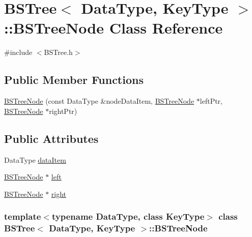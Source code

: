 \hypertarget{class_b_s_tree_1_1_b_s_tree_node}{\section{\-B\-S\-Tree$<$ \-Data\-Type, \-Key\-Type $>$\-:\-:\-B\-S\-Tree\-Node \-Class \-Reference}
\label{class_b_s_tree_1_1_b_s_tree_node}
}


{\ttfamily \#include $<$\-B\-S\-Tree.\-h$>$}

\subsection*{\-Public \-Member \-Functions}
\begin{DoxyCompactItemize}
\item 
\hyperlink{class_b_s_tree_1_1_b_s_tree_node_a40f0e1ccea243f6d47b5c1b0a2913ff8}{\-B\-S\-Tree\-Node} (const \-Data\-Type \&node\-Data\-Item, \hyperlink{class_b_s_tree_1_1_b_s_tree_node}{\-B\-S\-Tree\-Node} $\ast$left\-Ptr, \hyperlink{class_b_s_tree_1_1_b_s_tree_node}{\-B\-S\-Tree\-Node} $\ast$right\-Ptr)
\end{DoxyCompactItemize}
\subsection*{\-Public \-Attributes}
\begin{DoxyCompactItemize}
\item 
\-Data\-Type \hyperlink{class_b_s_tree_1_1_b_s_tree_node_a507c8d6dde1b8d35d9af6b4e78f38962}{data\-Item}
\item 
\hyperlink{class_b_s_tree_1_1_b_s_tree_node}{\-B\-S\-Tree\-Node} $\ast$ \hyperlink{class_b_s_tree_1_1_b_s_tree_node_a7a90150dd249432e240dc363955c5ca1}{left}
\item 
\hyperlink{class_b_s_tree_1_1_b_s_tree_node}{\-B\-S\-Tree\-Node} $\ast$ \hyperlink{class_b_s_tree_1_1_b_s_tree_node_a8d7bfd0208a562c8b8ab332e1d796563}{right}
\end{DoxyCompactItemize}
\subsubsection*{template$<$typename \-Data\-Type, class \-Key\-Type$>$ class B\-S\-Tree$<$ Data\-Type, Key\-Type $>$\-::\-B\-S\-Tree\-Node}




